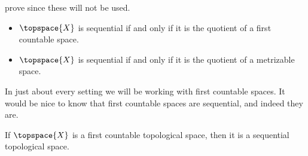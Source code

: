         prove since these will not be used.
        \begin{itemize}
            \item $\topspace{X}$ is sequential if and only if it is the quotient
                of a first countable space.
            \item $\topspace{X}$ is sequential if and only if it is the quotient
                of a metrizable space.
        \end{itemize}
        In just about every setting we will be working with first countable
        spaces. It would be nice to know that first countable spaces are
        sequential, and indeed they are.
        \begin{theorem}
            \label{thm:First_Countable_Implies_Sequential}%
            If $\topspace{X}$ is a first countable topological space, then it
            is a sequential topological space.
        \end{theorem}
